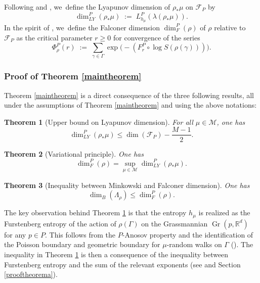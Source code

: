 \documentclass[JEP,XML,SOM,Unicode,NoEqCountersInSection,published]{cedram}
\newtheorem{theorem}{Theorem}[section]
\newcommand{\R}{\mathbb{R}}
\newcommand{\F}{\mathcal{F}}
\newcommand{\M}{\mathcal M}
\let\G\Gamma
\DeclareMathOperator{\Gr}{Gr}
\begin{document}
Following \cite{DO80} and \cite{KY79}, we~define the Lyapunov dimension of \(\rho_*\mu\) on \(\F_P\) by
\begin{equation}\label{dimlyap:definition}\dim_{LY}^P(\rho_*\mu) \; := \; L_{h_\mu}^P (\lambda(\rho_*\mu)). \end{equation}
In the spirit of \cite{Fal88}, we~define the Falconer dimension \(\dim_F^P(\rho)\) of \(\rho\) relative to~\(\F_P\) as the critical parameter \(r \ge 0\) for convergence of the series
\begin{equation}\label{falconerseries} \Phi_\rho^P (r) \; := \; \sum_{\gamma \in \Gamma} \exp \bigl(-(F_r^P\circ\log S(\rho(\gamma)))\bigr).\end{equation}

\subsubsection{Proof of Theorem \ref{maintheorem}}

Theorem \ref{maintheorem} is a direct consequence of the three following results, all under the assumptions of Theorem \ref{maintheorem} and using the above notations:

\begin{theorem}[Upper bound on Lyapunov dimension]\label{theorema}
For all \(\mu \in \M\), one has
\[
\dim_{LY}^P(\rho_*\mu) \le \dim(\F_P) - \frac{M - 1}{2}.
\]
\end{theorem}

\begin{theorem}[Variational principle]\label{theoremb}
One has \begin{equation} \label{Lyapunov} \dim_F^P(\rho) = \sup_{\mu \in \M}\dim_{LY}^P(\rho_*\mu).\end{equation}
\end{theorem}

\begin{theorem}[Inequality between Minkowski and Falconer dimension]\label{theoremc}
One has
\[
\dim_B(\Lambda_\rho) \le \dim_F^P(\rho).
\]
\end{theorem}

The key observation behind Theorem \ref{theorema} is that the entropy \(h_\mu\) is realized as the Furstenberg entropy of the action of \(\rho (\G)\) on the Grassmannian \(\Gr(p,\R^d)\) for any \(p \in P\). This follows from the \(P\)-Anosov property and the identification of the Poisson boundary and geometric boundary for \(\mu\)-random walks on \(\Gamma\) (\cite{Kai00}). The inequality in Theorem \ref{theorema} is then a consequence of the inequality between Furstenberg entropy and the sum of the relevant exponents (see \cite{LL23} and Section \ref{prooftheorema}).
\end{document}

